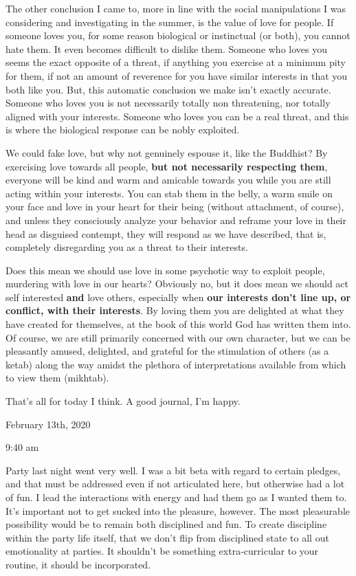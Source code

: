 \qquad The other conclusion I came to, more in line with the social
manipulations I was considering and investigating in the summer, is the
value of love for people. If someone loves you, for some reason
biological or instinctual (or both), you cannot hate them. It even
becomes difficult to dislike them. Someone who loves you seems the exact
opposite of a threat, if anything you exercise at a minimum pity for
them, if not an amount of reverence for you have similar interests in
that you both like you. But, this automatic conclusion we make isn't
exactly accurate. Someone who loves you is not necessarily totally non
threatening, nor totally aligned with your interests. Someone who loves
you can be a real threat, and this is where the biological response can
be nobly exploited.

\qquad We could fake love, but why not genuinely espouse it, like the
Buddhist? By exercising love towards all people, \textbf{but not
necessarily respecting them}, everyone will be kind and warm and
amicable towards you while you are still acting within your interests.
You can stab them in the belly, a warm smile on your face and love in
your heart for their being (without attachment, of course), and unless
they consciously analyze your behavior and reframe your love in their
head as disguised contempt, they will respond as we have described, that
is, completely disregarding you as a threat to their interests.

Does this mean we should use love in some psychotic way to exploit
people, murdering with love in our hearts? Obviously no, but it does
mean we should act self interested \textbf{and} love others, especially
when \textbf{our interests don't line up, or conflict, with their
interests}. By loving them you are delighted at what they have created
for themselves, at the book of this world God has written them into. Of
course, we are still primarily concerned with our own character, but we
can be pleasantly amused, delighted, and grateful for the stimulation of
others (as a ketab) along the way amidst the plethora of interpretations
available from which to view them (mikhtab).

\qquad That's all for today I think. A good journal, I'm happy.

\bigskip
\bigskip
February 13th, 2020

9:40 am

Party last night went very well. I was a bit beta with regard to certain
pledges, and that must be addressed even if not articulated here, but
otherwise had a lot of fun. I lead the interactions with energy and had
them go as I wanted them to. It's important not to get sucked into the
pleasure, however. The most pleasurable possibility would be to remain
both disciplined and fun. To create discipline within the party life
itself, that we don't flip from disciplined state to all out
emotionality at parties. It shouldn't be something extra-curricular to
your routine, it should be incorporated.

